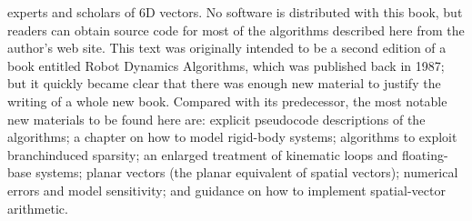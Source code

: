 experts and scholars of 6D vectors. No software is distributed with this book, but readers can obtain source code for most of the algorithms described here from the author’s web site. This text was originally intended to be a second edition of a book entitled Robot Dynamics Algorithms, which was published back in 1987; but it quickly became clear that there was enough new material to justify the writing of a whole new book. Compared with its predecessor, the most notable new materials to be found here are: explicit pseudocode descriptions of the algorithms; a chapter on how to model rigid-body systems; algorithms to exploit branchinduced sparsity; an enlarged treatment of kinematic loops and floating-base systems; planar vectors (the planar equivalent of spatial vectors); numerical errors and model sensitivity; and guidance on how to implement spatial-vector arithmetic.

